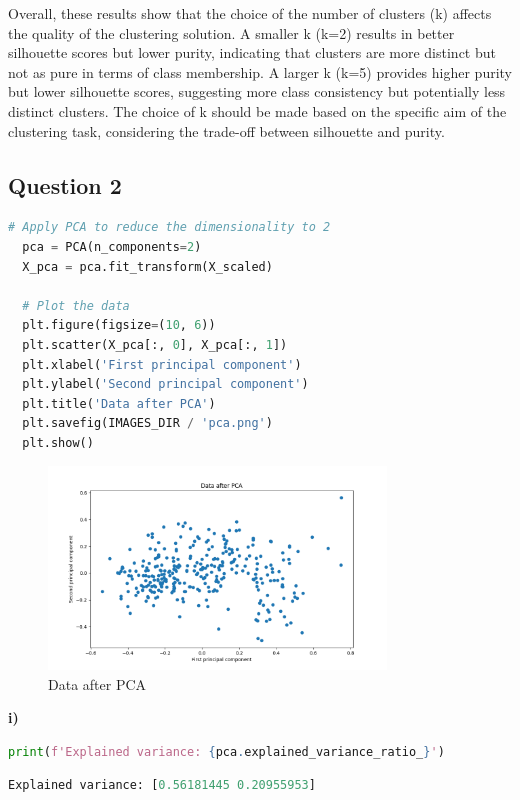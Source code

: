 \documentclass{article}
\begin{document}
Overall, these results show that the choice of the number of clusters (k) affects the quality of the clustering solution. A smaller k (k=2) results in better silhouette scores but lower purity, indicating that clusters are more distinct but not as pure in terms of class membership. A larger k (k=5) provides higher purity but lower silhouette scores, suggesting more class consistency but potentially less distinct clusters. The choice of k should be made based on the specific aim of the clustering task, considering the trade-off between silhouette and purity.

\subsection*{Question 2}
\begin{lstlisting}[language=Python]
  # Apply PCA to reduce the dimensionality to 2
  pca = PCA(n_components=2)
  X_pca = pca.fit_transform(X_scaled)
  
  # Plot the data
  plt.figure(figsize=(10, 6))
  plt.scatter(X_pca[:, 0], X_pca[:, 1])
  plt.xlabel('First principal component')
  plt.ylabel('Second principal component')
  plt.title('Data after PCA')
  plt.savefig(IMAGES_DIR / 'pca.png')
  plt.show()
\end{lstlisting}

\begin{figure}[H]
  \centering
  \includegraphics[width=0.8\textwidth]{images/pca.png}
  \caption{Data after PCA}
  \label{fig:pca}
\end{figure}

\textbf{i)}

\begin{lstlisting}[language=Python]
  print(f'Explained variance: {pca.explained_variance_ratio_}')
\end{lstlisting}
\begin{lstlisting}[language=Python]
Explained variance: [0.56181445 0.20955953]
\end{lstlisting}
\end{document}
